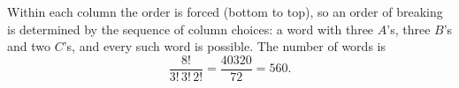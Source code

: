 Within each column the order is forced (bottom to top), so an order of breaking is determined by the sequence of column choices: a word with three $A$'s, three $B$'s and two $C$'s, and every such word is possible. The number of words is
\[
\dfrac{8!}{3!\,3!\,2!}=\dfrac{40320}{72}=\boxed{560}.
\]

